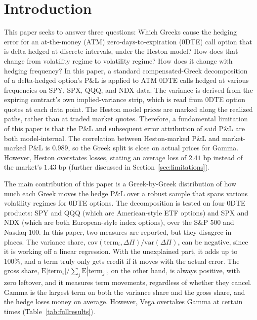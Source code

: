\documentclass[11pt]{article}
\begin{document}
\section{Introduction}
This paper seeks to answer three questions: Which Greeks cause the hedging error for an at-the-money (ATM) zero-days-to-expiration (0DTE) call option that is delta-hedged at discrete intervals, under the Heston model? How does that change from volatility regime to volatility regime? How does it change with hedging frequency?
In this paper, a standard compensated-Greek decomposition of a delta-hedged option's P\&L is applied to ATM
0DTE calls hedged at various frequencies on SPY, SPX, QQQ, and NDX data. The variance is derived from the expiring contract's own
implied-variance strip, which is read from 0DTE option quotes at each data point. The Heston model prices are marked along the realized paths, rather than at traded market quotes. Therefore, a fundamental limitation of this paper is that the P\&L and subsequent error attribution of said P\&L are both model-internal. The correlation between Heston-marked P\&L and market-marked P\&L is 0.989, so the Greek split is close on actual prices for Gamma. However, Heston overstates losses, stating an average loss of $2.41$ bp instead of the market's $1.43$ bp (further discussed in Section~\ref{sec:limitations}).

The main contribution of this paper is a Greek-by-Greek distribution of how much each Greek moves the hedge P\&L over a robust sample that spans various volatility regimes for 0DTE options. The decomposition is tested on four 0DTE products: SPY and QQQ (which are American-style ETF options) and SPX and NDX (which are both European-style index options), over the S\&P 500 and Nasdaq-100. In this paper, two measures are reported, but they disagree in places. The variance share, $\mathrm{cov}(\text{term}_i,\Delta\Pi)/\mathrm{var}(\Delta\Pi)$, can be negative, since it is working off a linear regression. With the unexplained part, it adds up to $100\%$, and a term truly only gets credit if it moves with the actual error. The gross share, $\mathrm{E}|\text{term}_i| / \sum_j \mathrm{E}|\text{term}_j|$, on the other hand, is always positive, with zero leftover, and it measures term movements, regardless of whether they cancel. Gamma is the largest term on both the variance share and the gross share, and the hedge loses money on average. However, Vega overtakes Gamma at certain times (Table~\ref{tab:fullresults}).
\end{document}
